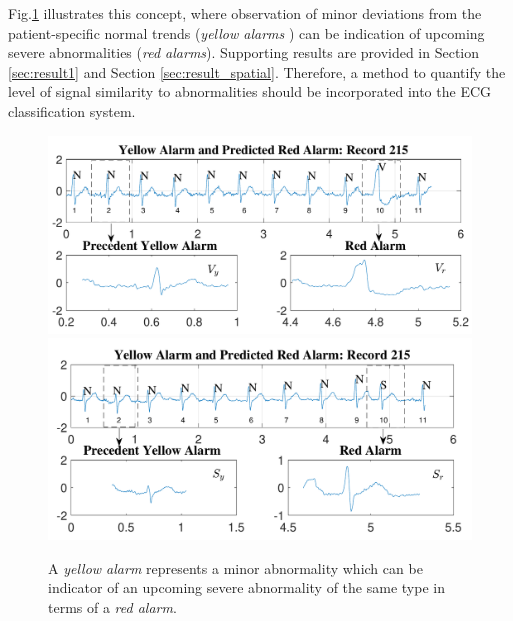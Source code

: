 Fig.\ref{fig:pred_signals} illustrates this concept, where observation of minor deviations from the patient-specific normal trends (\textit{yellow alarms} ) can be indication of upcoming severe abnormalities (\textit{red alarms}). Supporting results are provided in Section \ref{sec:result1} and Section \ref{sec:result_spatial}.%
Therefore, a method to quantify the level of signal similarity to abnormalities should be incorporated into the ECG classification system.

 \begin{figure}[t]
 	\centering
 	\includegraphics[scale=0.6]{Fig/predicting_record215S_numbered.pdf}
 	\includegraphics[scale=0.62]{Fig/predicting_record215_numbered.pdf} 
 	\caption{A \textit{yellow alarm} represents a minor abnormality which can be indicator of an upcoming severe abnormality of the same type in terms of a \textit{red alarm}.}
 	\label{fig:pred_signals}
 \end{figure}




